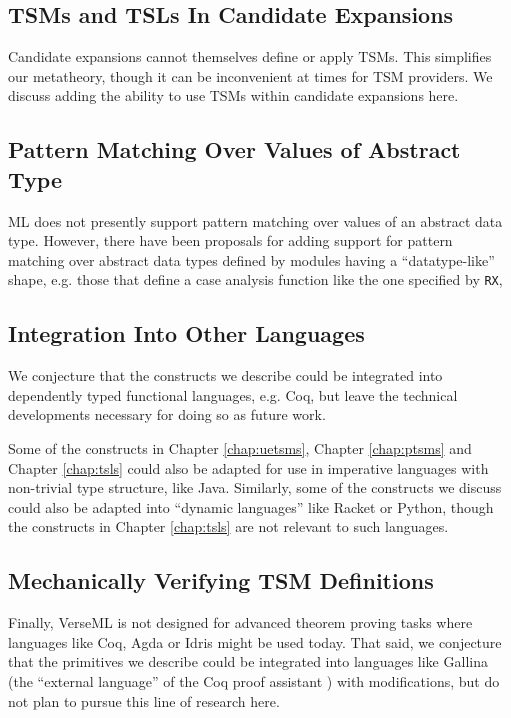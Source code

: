 {\subsection{TSMs and TSLs In Candidate Expansions}\label{sec:tsms-in-expansions}


Candidate expansions cannot themselves define or apply TSMs. This simplifies our metatheory, though it can be inconvenient at times for TSM providers. We discuss adding the ability to use TSMs within candidate expansions here.

\subsection{Pattern Matching Over Values of Abstract Type}\label{sec:patterns-for-abstract-types}
ML does not presently support pattern matching over values of an abstract data type. However, there have been proposals for adding support for pattern matching over abstract data types defined by modules having a ``datatype-like'' shape, e.g. those that define a case analysis function like the one specified by \lstinline{RX}, %


\subsection{Integration Into Other Languages}\label{sec:integration}
We conjecture that the constructs we describe could be integrated into dependently typed functional languages, e.g. Coq, but leave the technical developments necessary for doing so as future work.

Some of the constructs in Chapter \ref{chap:uetsms}, Chapter \ref{chap:ptsms} and Chapter \ref{chap:tsls} could also be adapted for use in imperative languages with non-trivial type structure, like Java. Similarly, some of the constructs we discuss could also be adapted into ``{dynamic languages}'' like Racket or Python, though the constructs in Chapter \ref{chap:tsls} are not relevant to such languages. 


\subsection{Mechanically Verifying TSM Definitions}\label{sec:verifying-tsms}
Finally, VerseML is not designed for advanced theorem proving tasks where languages like Coq, Agda or Idris might be used today. That said, we conjecture that the primitives we describe could be integrated into languages like Gallina (the ``external language'' of the Coq proof assistant  \cite{Coq:manual}) with  modifications, but do not plan to pursue this line of research here.

}
